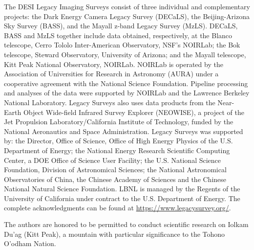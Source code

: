 \documentclass[12pt, letterpaper, preprint, comicneue]{aastex63}
\begin{document}
The DESI Legacy Imaging Surveys consist of three individual and complementary
projects: the Dark Energy Camera Legacy Survey (DECaLS), the Beijing-Arizona
Sky Survey (BASS), and the Mayall z-band Legacy Survey (MzLS). DECaLS, BASS and
MzLS together include data obtained, respectively, at the Blanco telescope,
Cerro Tololo Inter-American Observatory, NSF’s NOIRLab; the Bok telescope,
Steward Observatory, University of Arizona; and the Mayall telescope, Kitt Peak
National Observatory, NOIRLab. NOIRLab is operated by the Association of
Universities for Research in Astronomy (AURA) under a cooperative agreement
with the National Science Foundation. Pipeline processing and analyses of the
data were supported by NOIRLab and the Lawrence Berkeley National Laboratory.
Legacy Surveys also uses data products from the Near-Earth Object Wide-field
Infrared Survey Explorer (NEOWISE), a project of the Jet Propulsion
Laboratory/California Institute of Technology, funded by the National
Aeronautics and Space Administration. Legacy Surveys was supported by: the
Director, Office of Science, Office of High Energy Physics of the U.S.
Department of Energy; the National Energy Research Scientific Computing Center,
a DOE Office of Science User Facility; the U.S. National Science Foundation,
Division of Astronomical Sciences; the National Astronomical Observatories of
China, the Chinese Academy of Sciences and the Chinese National Natural Science
Foundation. LBNL is managed by the Regents of the University of California
under contract to the U.S. Department of Energy. 
The complete acknowledgments can be found at
\url{https://www.legacysurvey.org/}.

The authors are honored to be permitted to conduct scientific research on
Iolkam Du’ag (Kitt Peak), a mountain with particular significance to the Tohono
O’odham Nation.

\appendix





 
\end{document}
